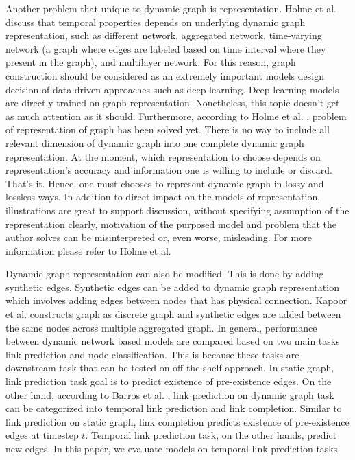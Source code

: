 \documentclass{IEEEtran}
\begin{document}
Another problem that unique to dynamic graph is representation. Holme et al. \cite{holme2012temporal} discuss that temporal properties depends on underlying dynamic graph representation, such as different network, aggregated network, time-varying network (a graph where edges are labeled based on time interval where they present in the graph), and multilayer network. For this reason, graph construction should be considered as an extremely important models design decision of data driven approaches such as deep learning. Deep learning models are directly trained on graph representation. Nonetheless, this topic doesn't get as much attention as it should. Furthermore, according to Holme et al. \cite{holme2015modern}, problem of representation of graph has been solved yet. There is no way to include all relevant dimension of dynamic graph into one complete dynamic graph representation. At the moment, which representation to choose depends on representation's accuracy and information one is willing to include or discard. That's it. Hence, one must chooses to represent dynamic graph in lossy and lossless ways. In addition to direct impact on the models of representation, illustrations are great to support discussion, without specifying assumption of the representation clearly, motivation of the purposed model and problem that the author solves can be misinterpreted or, even worse, misleading. For more information please refer to Holme et al. \cite{holme2015modern}

Dynamic graph representation can also be modified. This is done by adding synthetic edges. Synthetic edges can be added to dynamic graph representation which involves adding edges between nodes that has physical connection. Kapoor et al. \cite{kapoor2020examining} constructs graph as discrete graph and synthetic edges are added between the same nodes across multiple aggregated graph.
In general, performance between dynamic network based models are compared based on two main tasks link prediction and node classification. This is because these tasks are downstream task that can be tested on off-the-shelf approach. In static graph, link prediction task goal is to predict existence of pre-existence edges. On the other hand, according to Barros et al. \cite{barrosSurveyEmbeddingDynamic2021}, link prediction on dynamic graph task can be categorized into temporal link prediction and link completion. Similar to link prediction on static graph, link completion predicts existence of pre-existence edges at timestep \(t\). Temporal link prediction task, on the other hands, predict new edges. In this paper, we evaluate models on temporal link prediction tasks.
\end{document}
